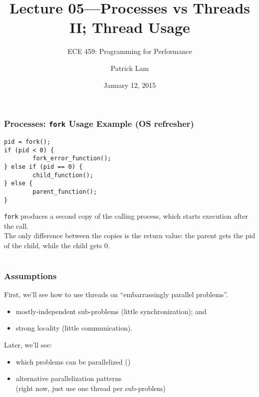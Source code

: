 \documentclass[aspectratio=43]{beamer}
\title{Lecture 05---Processes vs Threads II; Thread Usage}
\subtitle{ECE 459: Programming for Performance}
\author{Patrick Lam}
\institute{University of Waterloo}
\date{January 12, 2015}
\newenvironment{changemargin}[1]{%
  \begin{list}{}{%
    \setlength{\topsep}{0pt}%
    \setlength{\leftmargin}{#1}%
    \setlength{\rightmargin}{1em}
    \setlength{\listparindent}{\parindent}%
    \setlength{\itemindent}{\parindent}%
    \setlength{\parsep}{\parskip}%
  }%
  \item[]}{\end{list}}
\begin{document}
\begin{frame}[plain]
  \titlepage
\end{frame}

\begin{frame}[fragile]
  \frametitle{Processes: {\tt fork} Usage Example (OS refresher)}

  \begin{changemargin}{3cm}
    \begin{minipage}{.5\textwidth}
\begin{lstlisting}
pid = fork();
if (pid < 0) {
        fork_error_function();
} else if (pid == 0) {
        child_function();
} else {
        parent_function();
}
\end{lstlisting}
    \end{minipage}
  \end{changemargin}

  \begin{changemargin}{1cm}
     {\tt fork} produces a second copy of the calling process, which starts
          execution after the call.\\[1em]

    The only difference between the copies is the return value: the parent gets the pid of
          the child, while the child gets 0.
  \end{changemargin}
\end{frame}

\section{}
\begin{frame}
  \frametitle{Assumptions}

  \begin{changemargin}{0.5cm}
  First, we'll see how to use threads on ``embarrassingly parallel problems''.
  \begin{itemize}
    \item mostly-independent sub-problems (little synchronization); and
    \item strong locality (little communication).
  \end{itemize}
  \vfill
  Later, we'll see:
  \begin{itemize}
    \item which problems can be parallelized ()
    \item alternative parallelization patterns\\(right now, just use one thread
          per sub-problem)
  \end{itemize}
  \end{changemargin}
\end{frame}
\end{document}
